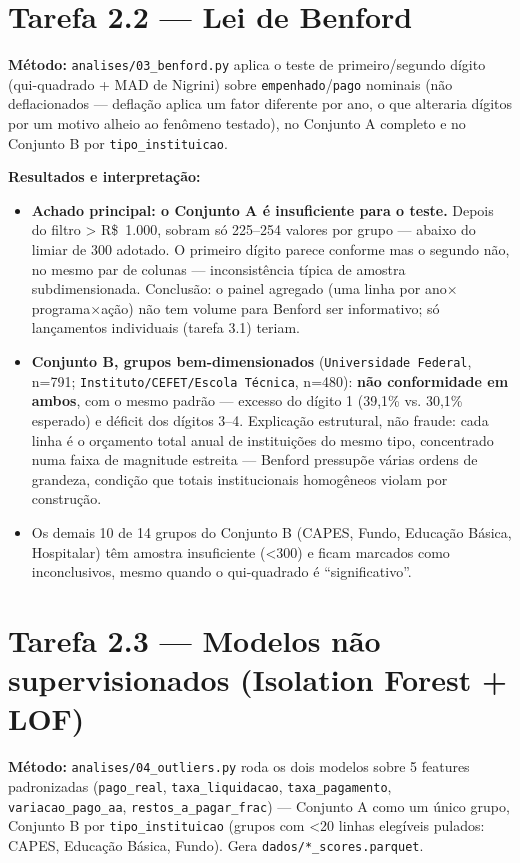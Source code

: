 \documentclass[11pt,a4paper]{article}
\begin{document}
\section{Tarefa 2.2 --- Lei de Benford}

\textbf{Método:} \texttt{analises/03\_benford.py} aplica o teste de
primeiro/segundo dígito (qui-quadrado + MAD de Nigrini) sobre
\texttt{empenhado}/\texttt{pago} nominais (não deflacionados --- deflação
aplica um fator diferente por ano, o que alteraria dígitos por um motivo
alheio ao fenômeno testado), no Conjunto A completo e no Conjunto B por
\texttt{tipo\_instituicao}.

\textbf{Resultados e interpretação:}

\begin{itemize}
    \item \textbf{Achado principal: o Conjunto A é insuficiente para o
    teste.} Depois do filtro > R\$~1.000, sobram só 225--254 valores por
    grupo --- abaixo do limiar de 300 adotado. O primeiro dígito parece
    conforme mas o segundo não, no mesmo par de colunas --- inconsistência
    típica de amostra subdimensionada. Conclusão: o painel agregado (uma
    linha por ano$\times$programa$\times$ação) não tem volume para Benford ser
    informativo; só lançamentos individuais (tarefa 3.1) teriam.
    \item \textbf{Conjunto B, grupos bem-dimensionados}
    (\texttt{Universidade Federal}, n=791; \texttt{Instituto/CEFET/Escola
    Técnica}, n=480): \textbf{não conformidade em ambos}, com o mesmo
    padrão --- excesso do dígito 1 (39,1\% vs. 30,1\% esperado) e déficit
    dos dígitos 3--4. Explicação estrutural, não fraude: cada linha é o
    orçamento total anual de instituições do mesmo tipo, concentrado numa
    faixa de magnitude estreita --- Benford pressupõe várias ordens de
    grandeza, condição que totais institucionais homogêneos violam por
    construção.
    \item Os demais 10 de 14 grupos do Conjunto B (CAPES, Fundo, Educação
    Básica, Hospitalar) têm amostra insuficiente (<300) e ficam marcados
    como inconclusivos, mesmo quando o qui-quadrado é ``significativo''.
\end{itemize}

\section{Tarefa 2.3 --- Modelos não supervisionados (Isolation Forest + LOF)}

\textbf{Método:} \texttt{analises/04\_outliers.py} roda os dois modelos
sobre 5 features padronizadas (\texttt{pago\_real}, \texttt{taxa\_liquidacao},
\texttt{taxa\_pagamento}, \texttt{variacao\_pago\_aa},
\texttt{restos\_a\_pagar\_frac}) --- Conjunto A como um único grupo,
Conjunto B por \texttt{tipo\_instituicao} (grupos com <20 linhas
elegíveis pulados: CAPES, Educação Básica, Fundo). Gera
\texttt{dados/*\_scores.parquet}.
\end{document}
